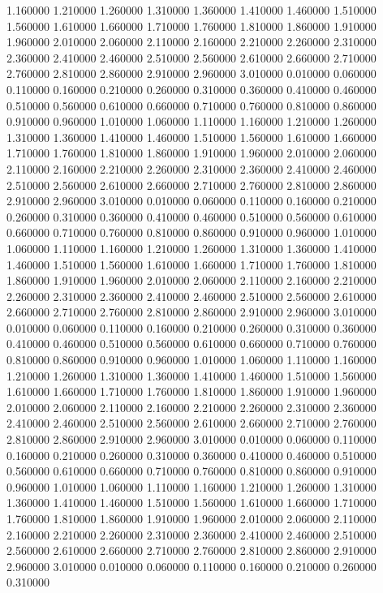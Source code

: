 1.160000
1.210000
1.260000
1.310000
1.360000
1.410000
1.460000
1.510000
1.560000
1.610000
1.660000
1.710000
1.760000
1.810000
1.860000
1.910000
1.960000
2.010000
2.060000
2.110000
2.160000
2.210000
2.260000
2.310000
2.360000
2.410000
2.460000
2.510000
2.560000
2.610000
2.660000
2.710000
2.760000
2.810000
2.860000
2.910000
2.960000
3.010000
0.010000
0.060000
0.110000
0.160000
0.210000
0.260000
0.310000
0.360000
0.410000
0.460000
0.510000
0.560000
0.610000
0.660000
0.710000
0.760000
0.810000
0.860000
0.910000
0.960000
1.010000
1.060000
1.110000
1.160000
1.210000
1.260000
1.310000
1.360000
1.410000
1.460000
1.510000
1.560000
1.610000
1.660000
1.710000
1.760000
1.810000
1.860000
1.910000
1.960000
2.010000
2.060000
2.110000
2.160000
2.210000
2.260000
2.310000
2.360000
2.410000
2.460000
2.510000
2.560000
2.610000
2.660000
2.710000
2.760000
2.810000
2.860000
2.910000
2.960000
3.010000
0.010000
0.060000
0.110000
0.160000
0.210000
0.260000
0.310000
0.360000
0.410000
0.460000
0.510000
0.560000
0.610000
0.660000
0.710000
0.760000
0.810000
0.860000
0.910000
0.960000
1.010000
1.060000
1.110000
1.160000
1.210000
1.260000
1.310000
1.360000
1.410000
1.460000
1.510000
1.560000
1.610000
1.660000
1.710000
1.760000
1.810000
1.860000
1.910000
1.960000
2.010000
2.060000
2.110000
2.160000
2.210000
2.260000
2.310000
2.360000
2.410000
2.460000
2.510000
2.560000
2.610000
2.660000
2.710000
2.760000
2.810000
2.860000
2.910000
2.960000
3.010000
0.010000
0.060000
0.110000
0.160000
0.210000
0.260000
0.310000
0.360000
0.410000
0.460000
0.510000
0.560000
0.610000
0.660000
0.710000
0.760000
0.810000
0.860000
0.910000
0.960000
1.010000
1.060000
1.110000
1.160000
1.210000
1.260000
1.310000
1.360000
1.410000
1.460000
1.510000
1.560000
1.610000
1.660000
1.710000
1.760000
1.810000
1.860000
1.910000
1.960000
2.010000
2.060000
2.110000
2.160000
2.210000
2.260000
2.310000
2.360000
2.410000
2.460000
2.510000
2.560000
2.610000
2.660000
2.710000
2.760000
2.810000
2.860000
2.910000
2.960000
3.010000
0.010000
0.060000
0.110000
0.160000
0.210000
0.260000
0.310000
0.360000
0.410000
0.460000
0.510000
0.560000
0.610000
0.660000
0.710000
0.760000
0.810000
0.860000
0.910000
0.960000
1.010000
1.060000
1.110000
1.160000
1.210000
1.260000
1.310000
1.360000
1.410000
1.460000
1.510000
1.560000
1.610000
1.660000
1.710000
1.760000
1.810000
1.860000
1.910000
1.960000
2.010000
2.060000
2.110000
2.160000
2.210000
2.260000
2.310000
2.360000
2.410000
2.460000
2.510000
2.560000
2.610000
2.660000
2.710000
2.760000
2.810000
2.860000
2.910000
2.960000
3.010000
0.010000
0.060000
0.110000
0.160000
0.210000
0.260000
0.310000
